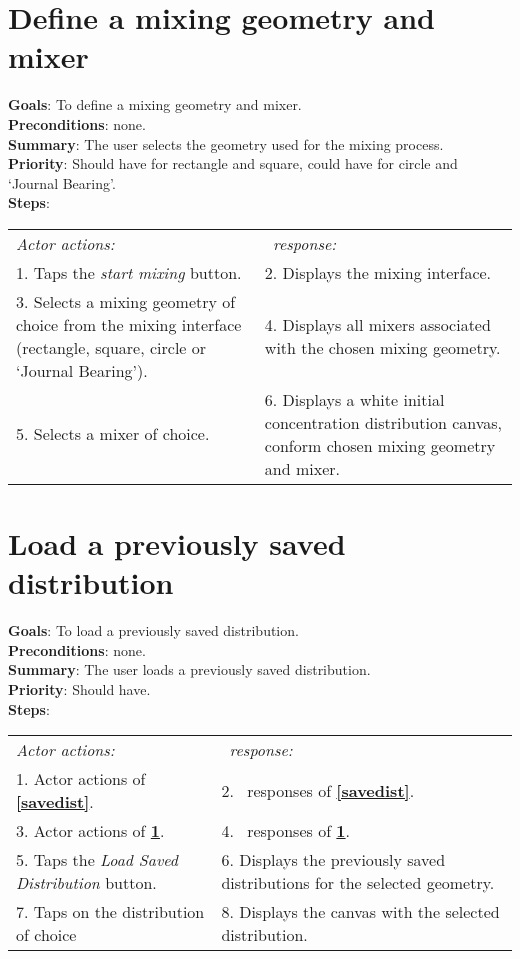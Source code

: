 \section{Define a mixing geometry and mixer}
  \label{geomixer}
  \textbf{Goals}: To define a mixing geometry and mixer.\\
  \textbf{Preconditions}: none.\\
  \textbf{Summary}: The user selects the geometry used for the mixing process.\\
  \textbf{Priority}: Should have for rectangle and square, could have for circle and `Journal Bearing'.\\
  \textbf{Steps}: \\
  \begin{tabular}{ p{} p{} }
  	\emph{Actor actions:} & \emph{\projectname\ response:} \\
	1. Taps the \emph{start mixing} button. & 2. Displays the mixing interface.\\
	3. Selects a mixing geometry of choice from the mixing interface (rectangle, square, circle or `Journal Bearing'). & 4. Displays all mixers associated with the chosen mixing geometry. \\
	5. Selects a mixer of choice. & 6. Displays a white initial concentration distribution canvas, conform chosen mixing geometry and mixer.\\
  \end{tabular}

  \section{Load a previously saved distribution}
  \label{loadsavedist}
  \textbf{Goals}: To load a previously saved distribution.\\
  \textbf{Preconditions}: none.\\
  \textbf{Summary}: The user loads a previously saved distribution.\\
  \textbf{Priority}: Should have.\\
  \textbf{Steps}: \\
  \begin{tabular}{ p{} p{} }
  	\emph{Actor actions:} & \emph{\projectname\ response:} \\
  	1. Actor actions of \textbf{\ref{savedist}}. & 2. \projectname\ responses of \textbf{\ref{savedist}}. \\
  	3. Actor actions of \textbf{\ref{geomixer}}. & 4. \projectname\ responses of \textbf{\ref{geomixer}}. \\
	5. Taps the \emph{Load Saved Distribution} button. & 6. Displays the previously saved distributions for the selected geometry. \\
	7. Taps on the distribution of choice & 8. Displays the canvas with the selected distribution. \\
  \end{tabular}
  
